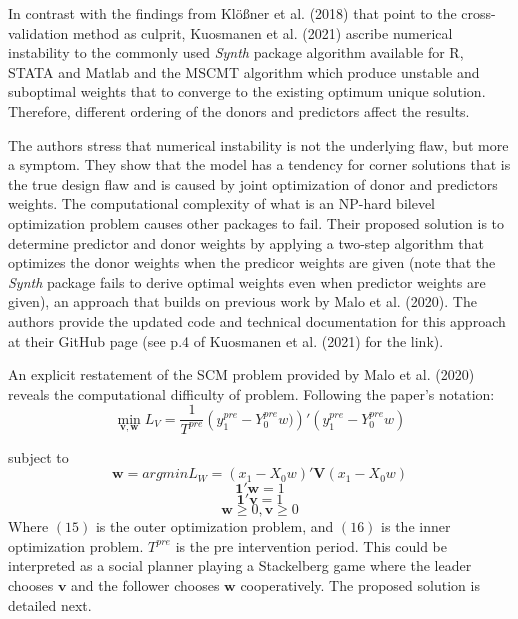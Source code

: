 \documentclass[12pt,a4paper,draft]{article}
\begin{document}
In contrast with the findings from Klößner et al. (2018) that point to the 
cross-validation method as culprit, Kuosmanen et al. (2021) ascribe numerical 
instability to the commonly used \emph{Synth} package algorithm available for 
R, STATA and Matlab and the MSCMT algorithm which produce unstable and suboptimal 
weights that to converge to the existing optimum unique solution. 
Therefore, different ordering of the donors and predictors affect the results. 

The authors stress that numerical instability is not the underlying flaw, but more 
a symptom. They show that the model has a tendency for corner solutions that 
is the true design flaw and is caused by joint optimization of donor and 
predictors weights. The computational complexity of what is an NP-hard 
bilevel optimization problem causes other packages to fail. 
Their proposed solution is to determine predictor and donor 
weights by applying a two-step algorithm that optimizes the donor 
weights when the predicor weights are given (note that the \emph{Synth} package 
fails to derive optimal weights even when predictor weights are given), 
an approach that builds on previous work by Malo et al. (2020). The
authors provide the updated code and technical documentation for this approach 
at their GitHub page (see p.4 of Kuosmanen et al. (2021) for the link).

An explicit restatement of the SCM problem provided by Malo et al. (2020) 
reveals the computational difficulty of problem. Following the paper's 
notation:
\begin{equation}
    \min_{\mathbf{v,w}} L_V = 
    \frac{1}{T^{pre}} \left(y_1^{pre}-Y_0^{pre}w)\right) ' 
    \left( y_1^{pre}-Y_0^{pre}w \right)
\end{equation}

subject to
\begin{equation}
    \mathbf{w}= argmin L_W = \left( x_1-X_0 w \right) ' \mathbf{V}
    \left( x_1 - X_0 w\right)
\end{equation}
$$\mathbf{1'w}=1$$
$$\mathbf{1'v}=1$$
$$\mathbf{w}\ge 0, \mathbf{v} \ge 0$$
Where $(15)$ is the outer optimization problem, and $(16)$ is the inner 
optimization problem. $T^{pre}$ is the pre intervention period. This could be 
interpreted as a social planner playing a Stackelberg game where the 
leader chooses $\mathbf{v}$ and the follower chooses $\mathbf{w}$ cooperatively.
\newline
The proposed solution is detailed next.
\end{document}
